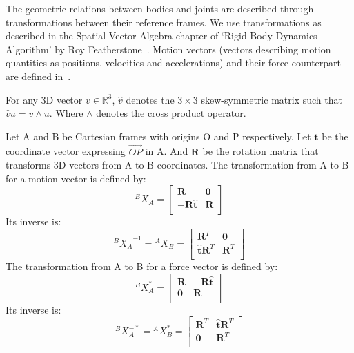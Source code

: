 The geometric relations between bodies and joints are described through transformations between their reference frames.
We use transformations as described in the Spatial Vector Algebra chapter of `Rigid Body Dynamics Algorithm' by Roy Featherstone~\cite{featherstone:book:2007}.
Motion vectors (vectors describing motion quantities as positions, velocities and accelerations) and their force counterpart are defined in~\cite{featherstone:book:2007}.

For any 3D vector $v\in\mathbb{R}^3$, $\hat{v}$ denotes the $3\times 3$ skew-symmetric matrix such that $\hat{v}u = v\wedge u$.
Where $\wedge$ denotes the cross product operator.

Let A and B be Cartesian frames with origins O and P respectively.
Let $\mathbf{t}$ be the coordinate vector expressing $\overrightarrow{OP}$ in A.
And $\mathbf{R}$ be the rotation matrix that transforms 3D vectors from A to B coordinates.
The transformation from A to B for a motion vector is defined by:
\begin{equation}
  {}^B X_A =
  \begin{bmatrix}
    \mathbf{R} & \mathbf{0} \\
    -\mathbf{R}\hat{\mathbf{t}} & \mathbf{R} \\
  \end{bmatrix}
\end{equation}
Its inverse is:
\begin{equation}
  {{}^B X_A}^{-1} = {}^A X_B =
  \begin{bmatrix}
    \mathbf{R}^T & \mathbf{0} \\
    \hat{\mathbf{t}}\mathbf{R}^T & \mathbf{R}^T \\
  \end{bmatrix}
\end{equation}
The transformation from A to B for a force vector is defined by:
\begin{equation}
  {}^B X_A^* =
  \begin{bmatrix}
    \mathbf{R} & -\mathbf{R}\hat{\mathbf{t}} \\
    \mathbf{0} & \mathbf{R} \\
  \end{bmatrix}
\end{equation}
Its inverse is:
\begin{equation}
  {}^B X_A^{-*} = {}^A X_B^* =
  \begin{bmatrix}
    \mathbf{R}^T & \hat{\mathbf{t}}\mathbf{R}^T \\
    \mathbf{0} & \mathbf{R}^T \\
  \end{bmatrix}
\end{equation}

